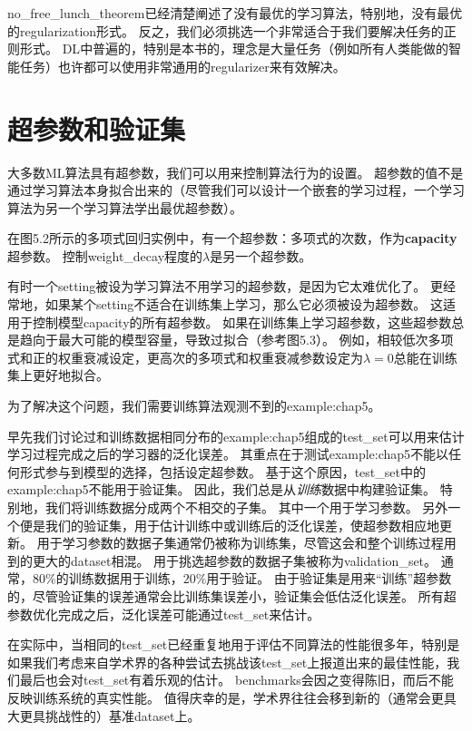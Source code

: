 \gls{no_free_lunch_theorem}已经清楚阐述了没有最优的学习算法，特别地，没有最优的\gls{regularization}形式。
反之，我们必须挑选一个非常适合于我们要解决任务的正则形式。
\gls{DL}中普遍的，特别是本书的，理念是大量任务（例如所有人类能做的智能任务）也许都可以使用非常通用的\gls{regularizer}来有效解决。

\section{超参数和验证集}
\label{sec:hyperparameters_and_validation_sets}
大多数\gls{ML}算法具有超参数，我们可以用来控制算法行为的设置。
超参数的值不是通过学习算法本身拟合出来的（尽管我们可以设计一个嵌套的学习过程，一个学习算法为另一个学习算法学出最优超参数）。

在图5.2所示的多项式回归实例中，有一个超参数：多项式的次数，作为\textbf{\gls{capacity}}超参数。
控制\gls{weight_decay}程度的$\lambda$是另一个超参数。

有时一个\gls{setting}被设为学习算法不用学习的超参数，是因为它太难优化了。
更经常地，如果某个\gls{setting}不适合在训练集上学习，那么它必须被设为超参数。
这适用于控制模型\gls{capacity}的所有超参数。
如果在训练集上学习超参数，这些超参数总是趋向于最大可能的模型容量，导致过拟合（参考图5.3）。
例如，相较低次多项式和正的权重衰减设定，更高次的多项式和权重衰减参数设定为$\lambda=0$总能在训练集上更好地拟合。


为了解决这个问题，我们需要训练算法观测不到的\gls{example:chap5}。

早先我们讨论过和训练数据相同分布的\gls{example:chap5}组成的\gls{test_set}可以用来估计学习过程完成之后的学习器的泛化误差。
其重点在于测试\gls{example:chap5}不能以任何形式参与到模型的选择，包括设定超参数。
基于这个原因，\gls{test_set}中的\gls{example:chap5}不能用于验证集。
因此，我们总是从\emph{训练}数据中构建验证集。
特别地，我们将训练数据分成两个不相交的子集。
其中一个用于学习参数。
另外一个便是我们的验证集，用于估计训练中或训练后的泛化误差，使超参数相应地更新。
用于学习参数的数据子集通常仍被称为训练集，尽管这会和整个训练过程用到的更大的\gls{dataset}相混。
用于挑选超参数的数据子集被称为\gls{validation_set}。
通常，$80\%$的训练数据用于训练，$20\%$用于验证。
由于验证集是用来“训练”超参数的，尽管验证集的误差通常会比训练集误差小，验证集会低估泛化误差。
所有超参数优化完成之后，泛化误差可能通过\gls{test_set}来估计。

在实际中，当相同的\gls{test_set}已经重复地用于评估不同算法的性能很多年，特别是如果我们考虑来自学术界的各种尝试去挑战该\gls{test_set}上报道出来的最佳性能，我们最后也会对\gls{test_set}有着乐观的估计。
\gls{benchmarks}会因之变得陈旧，而后不能反映训练系统的真实性能。
值得庆幸的是，学术界往往会移到新的（通常会更具大更具挑战性的）基准\gls{dataset}上。

